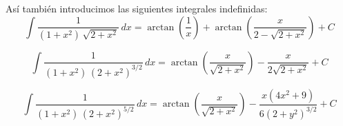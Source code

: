 \documentclass[12pt]{book}
\numberwithin{equation}{chapter}
\begin{document}
\newpage

As\'i tambi\'en introducimos las siguientes integrales indefinidas:
\begin{equation}\label{A5}
\int \frac{1}{(1+x^{2})\, \sqrt{2+x^{2}} } \, dx= \arctan \left( \frac{1}{x} \right) + \arctan \left( \frac{x}{2-\sqrt{2+x^{2}}} \right) + C
\end{equation}

\begin{equation}\label{A6}
\int \frac{1}{(1+x^{2})\, (2+x^{2})^{3/2} } \, dx= \arctan \left( \frac{x}{\sqrt{2+x^{2}}} \right) - \frac{x}{2 \sqrt{2+x^{2}}} + C
\end{equation}

\begin{equation}\label{A7}
\int \frac{1}{(1+x^{2})\, (2+x^{2})^{5/2} } \, dx= \arctan \left( \frac{x}{\sqrt{2+x^{2}}} \right) - \frac{x ( 4x^{2}+9 )}{6(2+y^{2})^{3/2}}+ C
\end{equation}

\end{document}
